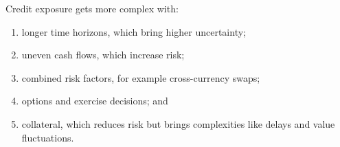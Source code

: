 
Credit exposure gets more complex with:

\begin{enumerate}[label=\alph*)]
\item longer time horizons, which bring higher uncertainty;
\item uneven cash flows, which increase risk;
\item combined risk factors, for example cross-currency swaps;
\item options and exercise decisions; and
\item collateral, which reduces risk but brings complexities like delays and
value fluctuations.
\end{enumerate}


